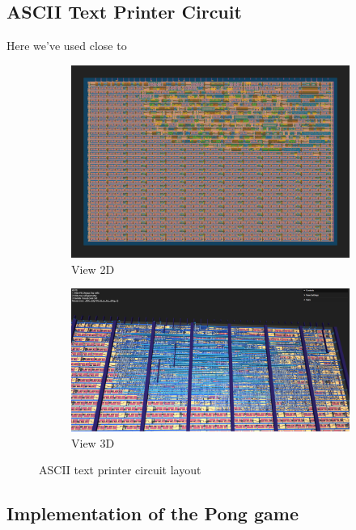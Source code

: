 \subsection{ASCII Text Printer Circuit}
Here we've used close to 
\begin{figure}[H]
    \centering
    \begin{subfigure}[b]{0.45\textwidth}
        \includegraphics[width=\linewidth]{Pictures/Result_ASCII_2D_View.png}
        \caption{View 2D}\label{fig:ASCII_2D}
    \end{subfigure}
    \begin{subfigure}[b]{0.45\textwidth}
        \includegraphics[width=\linewidth]{Pictures/Result_ASCII_3D_View.png}
        \caption{View 3D}\label{fig:ASCII_3D}
    \end{subfigure}
    \caption{ASCII text printer circuit layout}\label{fig:ASCII_Layout}
\end{figure}

\subsection{Implementation of the Pong game}

